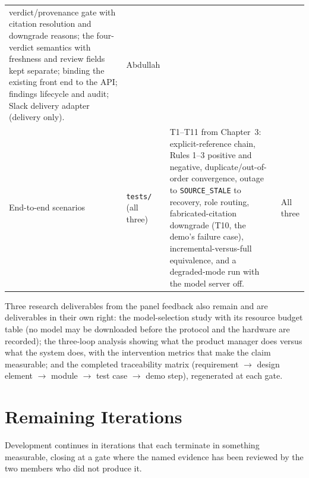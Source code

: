 \begin{longtable}{>{\raggedright\arraybackslash}p{} >{\raggedright\arraybackslash}p{} >{\raggedright\arraybackslash}p{} >{\raggedright\arraybackslash}p{}}
  verdict/provenance gate with citation resolution and downgrade reasons; the
  four-verdict semantics with freshness and review fields kept separate;
  binding the existing front end to the API; findings lifecycle and audit;
  Slack delivery adapter (delivery only).
  & Abdullah \\
End-to-end scenarios & \texttt{tests/} (all three) &
  T1--T11 from Chapter~3: explicit-reference chain, Rules 1--3 positive and
  negative, duplicate/out-of-order convergence, outage to
  \texttt{SOURCE\_STALE} to recovery, role routing, fabricated-citation
  downgrade (T10, the demo's failure case), incremental-versus-full
  equivalence, and a degraded-mode run with the model server off.
  & All three \\
\hline\end{longtable}

Three research deliverables from the panel feedback also remain and are
deliverables in their own right: the model-selection study with its resource
budget table (no model may be downloaded before the protocol and the hardware
are recorded); the three-loop analysis showing what the product manager does
versus what the system does, with the intervention metrics that make the claim
measurable; and the completed traceability matrix
(requirement $\rightarrow$ design element $\rightarrow$ module $\rightarrow$ test
case $\rightarrow$ demo step), regenerated at each gate.

\section{Remaining Iterations}
\label{sec:remaining-iterations}

Development continues in iterations that each terminate in something
measurable, closing at a gate where the named evidence has been reviewed by the
two members who did not produce it.

